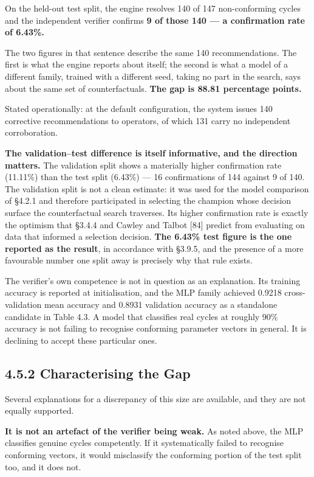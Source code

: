 On the held-out test split, the engine resolves 140 of 147 non-conforming cycles and the independent verifier confirms \textbf{9 of those 140 --- a confirmation rate of 6.43\%.}

The two figures in that sentence describe the same 140 recommendations. The first is what the engine reports about itself; the second is what a model of a different family, trained with a different seed, taking no part in the search, says about the same set of counterfactuals. \textbf{The gap is 88.81 percentage points.}

Stated operationally: at the default configuration, the system issues 140 corrective recommendations to operators, of which 131 carry no independent corroboration.

\textbf{The validation--test difference is itself informative, and the direction matters.} The validation split shows a materially higher confirmation rate (11.11\%) than the test split (6.43\%) --- 16 confirmations of 144 against 9 of 140. The validation split is not a clean estimate: it was used for the model comparison of §4.2.1 and therefore participated in selecting the champion whose decision surface the counterfactual search traverses. Its higher confirmation rate is exactly the optimism that §3.4.4 and Cawley and Talbot {[}84{]} predict from evaluating on data that informed a selection decision. \textbf{The 6.43\% test figure is the one reported as the result}, in accordance with §3.9.5, and the presence of a more favourable number one split away is precisely why that rule exists.

The verifier's own competence is not in question as an explanation. Its training accuracy is reported at initialisation, and the MLP family achieved 0.9218 cross-validation mean accuracy and 0.8931 validation accuracy as a standalone candidate in Table 4.3. A model that classifies real cycles at roughly 90\% accuracy is not failing to recognise conforming parameter vectors in general. It is declining to accept these particular ones.

\hypertarget{characterising-the-gap}{%
\subsection{4.5.2 Characterising the Gap}\label{characterising-the-gap}}

Several explanations for a discrepancy of this size are available, and they are not equally supported.

\textbf{It is not an artefact of the verifier being weak.} As noted above, the MLP classifies genuine cycles competently. If it systematically failed to recognise conforming vectors, it would misclassify the conforming portion of the test split too, and it does not.

